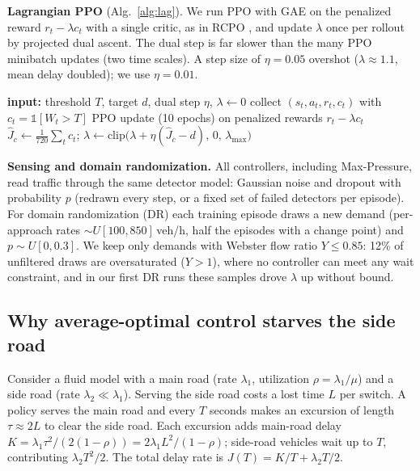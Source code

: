 \documentclass{article}
\begin{document}
\textbf{Lagrangian PPO} (Alg.~\ref{alg:lag}). We run PPO \cite{SchulmanWDRK17} with GAE
\cite{SchulmanMLJA16} on the penalized reward $r_t-\lambda c_t$ with a single critic, as in
RCPO \cite{TesslerMM19}, and update $\lambda$ once per rollout by projected dual ascent.
The dual step is far slower than the many PPO minibatch updates (two time scales).
A step size of $\eta=0.05$ overshot ($\lambda\approx1.1$, mean delay doubled); we use $\eta=0.01$.

\begin{algorithm}[t]
\caption{Lagrangian PPO for the max-wait constraint}\label{alg:lag}
\begin{algorithmic}
\STATE \textbf{input:} threshold $T$, target $d$, dual step $\eta$, $\lambda\gets0$
  \STATE collect $(s_t,a_t,r_t,c_t)$ with $c_t=\mathbb{1}[W_t>T]$
  \STATE PPO update (10 epochs) on penalized rewards $r_t-\lambda c_t$
  \STATE $\hat J_c\gets\frac{1}{720}\sum_t c_t$;\quad
         $\lambda\gets\mathrm{clip}\big(\lambda+\eta(\hat J_c-d),\,0,\,\lambda_{\max}\big)$
\ENDFOR
\end{algorithmic}
\end{algorithm}

\textbf{Sensing and domain randomization.} All controllers, including Max-Pressure, read
traffic through the same detector model: Gaussian noise and dropout with probability $p$
(redrawn every step, or a fixed set of failed detectors per episode). For domain
randomization (DR) \cite{TobinFRSZA17} each training episode draws a new demand (per-approach
rates $\sim U[100,850]$\,veh/h, half the episodes with a change point) and $p\sim U[0,0.3]$.
We keep only demands with Webster flow ratio $Y\le0.85$: 12\% of unfiltered draws are
oversaturated ($Y>1$), where no controller can meet any wait constraint, and in our first DR
runs these samples drove $\lambda$ up without bound.

\subsection{Why average-optimal control starves the side road}\label{sec:prop}
Consider a fluid model with a main road (rate $\lambda_1$, utilization
$\rho=\lambda_1/\mu$) and a side road (rate $\lambda_2\ll\lambda_1$). Serving the side road
costs a lost time $L$ per switch. A policy serves the main road and every $T$ seconds makes an
excursion of length $\tau\approx2L$ to clear the side road. Each excursion adds main-road delay
$K=\lambda_1\tau^2/(2(1-\rho))=2\lambda_1L^2/(1-\rho)$; side-road vehicles wait up to $T$,
contributing $\lambda_2T^2/2$. The total delay rate is $J(T)=K/T+\lambda_2T/2$.
\end{document}
